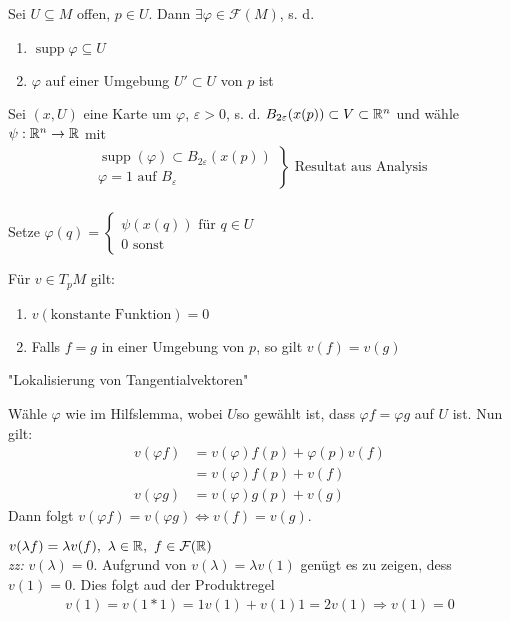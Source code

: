 \begin{hlem}
Sei $U \subseteq M$ offen, $p \in U$. Dann $\exists \varphi \in \mathcal{F}(M)$, s. d. 
\begin{enumerate}
\item$\operatorname{supp}\varphi\subseteq U$
\item$\varphi$ auf einer Umgebung $U' \subset U$ von $p$ ist
\end{enumerate}
\end{hlem}

\begin{bew}
Sei $(x, U)$ eine Karte um $\varphi$, $\varepsilon > 0$, s. d. $B_{2\varepsilon}(x(p))\subset V\subset \mathbb{R}^n$ und wähle $\psi:\mathbb{R}^n\rightarrow\mathbb{R}$ mit 
\begin{align*}
\left.
\begin{array}{r}
\operatorname{supp}(\varphi)\subset B_{2\varepsilon}(x(p))\\
\varphi = 1 \text{ auf } B_\varepsilon
\end{array}
\right\} \text{ Resultat aus Analysis}\\
\end{align*}

Setze $\varphi(q) = \left\{
\begin{array}{l}
\psi(x(q))\text{ für }q\in U\\
0 \text{ sonst}
\end{array}
\right.$
\end{bew}

\begin{satz}
Für $v\in T_p M$ gilt:
\begin{enumerate}
\item$v(\text{konstante Funktion}) = 0$
\item Falls $f = g$ in einer Umgebung von $p$, so gilt $v(f) = v(g)$
\end{enumerate}
"Lokalisierung von Tangentialvektoren"
\end{satz}

\begin{bew}[zu 2.]
Wähle $\varphi$ wie im Hilfslemma, wobei $U$so gewählt ist, dass $\varphi f = \varphi g$ auf $U$ ist. Nun gilt:
\begin{align*}
v(\varphi f) &= v(\varphi)f(p) + \varphi(p)v(f)\\
&= v(\varphi)f(p) + v(f)\\
v(\varphi g) &= v(\varphi)g(p) + v(g)
\end{align*}
Dann folgt $v(\varphi f) = v(\varphi g) \Leftrightarrow v(f) = v(g)$.
\end{bew}

\begin{bew}[zu 1.]
$v(\lambda f) = \lambda v(f),\ \lambda \in \mathbb{R},\ f\in \mathcal{F}(\mathbb{R})$\\
\textit{zz:} $v(\lambda) = 0$. Aufgrund von $v(\lambda) = \lambda v(1)$ genügt es zu zeigen, dess $v(1) = 0$. Dies folgt aud der Produktregel
\begin{align*}
v(1) = v(1*1) = 1v(1) + v(1)1 = 2v(1) \Rightarrow v(1) = 0
\end{align*}
\end{bew}